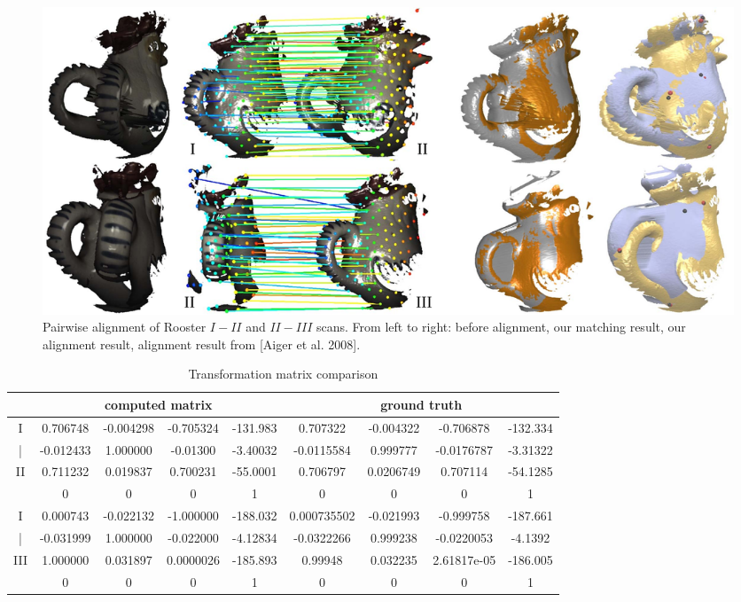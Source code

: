 \begin{figure}[t!]
\centering
  \includegraphics[width=0.99\linewidth]{figures/RoosterPair2.pdf}
  \caption{Pairwise alignment of Rooster \emph{$I-II$} and \emph{$II-III$} scans.
  From left to right: before alignment, our matching result, our alignment result, alignment result from [Aiger et al. 2008].}
\label{fig:3DPair}
\end{figure}

\begin{table}[tb]
\centering
\tabcolsep=1pt
\setlength{\aboverulesep}{0pt}
\setlength{\belowrulesep}{0pt}
\caption{Transformation matrix comparison}
\hspace{-5ex}
\label{tab:matrix}
\small
\begin{tabular}{|c |c c c c | c c c c|}
\toprule
 & \multicolumn{4}{|c|}{ {computed matrix}} & \multicolumn{4}{c|}{ {ground truth}} \\
\hline
{I} & {0.706748} 	& {-0.004298}   & {-0.705324}	& {-131.983}    & {0.707322} 	& {-0.004322}   & {-0.706878}	& {-132.334}   \\
{|}&{-0.012433}     &  {1.000000}	& {-0.01300} 	& {-3.40032}  & {-0.0115584}	& {0.999777}	& {-0.0176787}	& {-3.31322}   \\
{II}&{0.711232}	    & {0.019837}	& {0.700231}	& {-55.0001}  & {0.706797}     & {0.0206749}   & {0.707114}	& {-54.1285}   \\
&{0}             & {0}	        & {0}	        & {1}          & {0}             & {0}	        & {0}	        & {1}          \\
\hline
{I} & {0.000743} & {-0.022132} &  {-1.000000} & {-188.032}          & {0.000735502} & {-0.021993} &  {-0.999758} & {-187.661}  \\
{|}  &{-0.031999} & {1.000000} &{-0.022000} & {-4.12834}  	&{-0.0322266} & {0.999238} &{-0.0220053} & {-4.1392}   \\
{III} &{1.000000} & {0.031897} &{0.0000026} &{-185.893}       &{0.99948} & {0.032235} &{2.61817e-05} &{-186.005}  \\
&        {0}             & {0}	        & {0}	        & {1}          & {0}             & {0}	        & {0}	        & {1}          \\
\bottomrule
\end{tabular}%
\end{table}%


